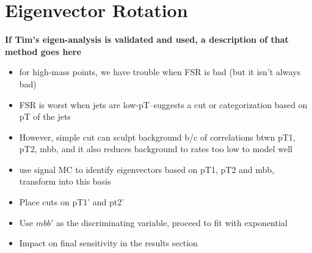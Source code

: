 




\section{Eigenvector Rotation}
\textbf{If Tim's eigen-analysis is validated and used, a description of that method goes here}

\begin{itemize}
    \item for high-mass points, we have trouble when FSR is bad (but it isn't always bad)
    \item FSR is worst when jets are low-pT--suggests a cut or categorization based
    on pT of the jets
    \item However, simple cut can sculpt background b/c of correlations btwn pT1, pT2, mbb,
    and it also reduces background to rates too low to model well
    \item use signal MC to identify eigenvectors based on pT1, pT2 and mbb, transform
    into this basis 
    \item Place cuts on pT1' and pt2'
    \item Use $mbb'$ as the discriminating variable, proceed to fit with exponential
    \item Impact on final sensitivity in the results section
\end{itemize}

